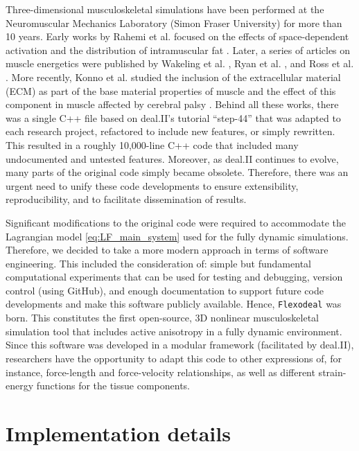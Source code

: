 \documentclass{sfuthesis}
\numberwithin{equation}{section}
\numberwithin{figure}{chapter}
\numberwithin{table}{chapter}
\theoremstyle{definition}
\begin{document}
Three-dimensional musculoskeletal simulations have been performed at the Neuromuscular Mechanics Laboratory (Simon Fraser University) for more than 10 years. Early works by Rahemi et al. focused on the effects of space-dependent activation \cite{RahemiNigamWakeling2014} and the distribution of intramuscular fat \cite{RahemiNigamWakeling2015}. Later, a series of articles on muscle energetics were published by Wakeling et al. \cite{Paper1_WakelingEtAl2020}, Ryan et al. \cite{Paper2_RyanEtAl2020}, and Ross et al. \cite{Paper3_RossEtAl2021}. More recently, Konno et al. studied the inclusion of the extracellular material (ECM) as part of the base material properties of muscle \cite{KonnoNigamWakeling2021_ECM} and the effect of this component in muscle affected by cerebral palsy \cite{KonnoEtAl2022_CP}. Behind all these works, there was a single C++ file based on deal.II's tutorial ``step-44'' \cite{step44} that was adapted to each research project, refactored to include new features, or simply rewritten. This resulted in a roughly 10,000-line C++ code that included many undocumented and untested features. Moreover, as deal.II continues to evolve, many parts of the original code simply became obsolete. Therefore, there was an urgent need to unify these code developments to ensure extensibility, reproducibility, and to facilitate dissemination of results.

Significant modifications to the original code were required to accommodate the Lagrangian model \eqref{eq:LF_main_system} used for the fully dynamic simulations. Therefore, we decided to take a more modern approach in terms of software engineering. This included the consideration of: simple but fundamental computational experiments that can be used for testing and debugging, version control (using GitHub), and enough documentation to support future code developments and make this software publicly available. Hence, \texttt{Flexodeal} was born. This constitutes the first open-source, 3D nonlinear musculoskeletal simulation tool that includes active anisotropy in a fully dynamic environment. Since this software was developed in a modular framework (facilitated by deal.II), researchers have the opportunity to adapt this code to other expressions of, for instance, force-length and force-velocity relationships, as well as different strain-energy functions for the tissue components.


\section{Implementation details} \label{sec:flexodeal_implementation}
\end{document}
